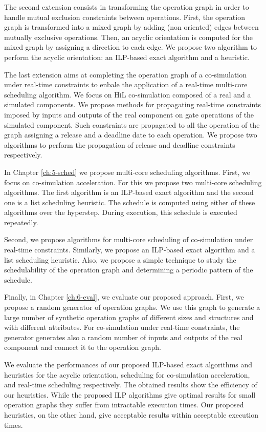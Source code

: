 The second extension consists in transforming the operation graph in order to handle mutual exclusion constraints between operations. First, the operation graph is transformed into a mixed graph by adding (non oriented) edges between mutually exclusive operations. Then, an acyclic orientation is computed for the mixed graph by assigning a direction to each edge. We propose two algorithm to perform the acyclic orientation: an ILP-based exact algorithm and a heuristic.

The last extension aims at completing the operation graph of a co-simulation under real-time constraints to enbale the application of a real-time multi-core scheduling algorithm. We focus on HiL co-simulation composed of a real and a simulated components. We propose methods for propagating real-time constraints imposed by inputs and outputs of the real component on gate operations of the simulated component. Such constraints are propagated to all the operation of the graph assigning a release and a deadline date to each operation. We propose two algorithms to perform the propagation of release and deadline constraints respectively.

In Chapter \ref{ch:5-sched} we propose multi-core scheduling algorithms. First, we focus on co-simulation acceleration. For this we propose two multi-core scheduling algorithms. The first algorithm is an ILP-based exact algorithm and the second one is a list scheduling heuristic. The schedule is computed using either of these algorithms over the hyperstep. During execution, this schedule is executed repeatedly.

Second, we propose algorithms for multi-core scheduling of co-simulation under real-time constraints. Similarly, we propose an ILP-based exact algorithm and a list scheduling heuristic. Also, we propose a simple technique to study the schedulability of the operation graph and determining a periodic pattern of the schedule.

Finally, in Chapter \ref{ch:6-eval}, we evaluate our proposed approach. First, we propose a random generator of operation graphs. We use this graph to generate a large number of synthetic operation graphs of different sizes and structures and with different attributes. For co-simulation under real-time constraints, the generator generates also a random number of inputs and outputs of the real component and connect it to the operation graph. 

We evaluate the performances of our proposed ILP-based exact algorithms and heuristics for the acyclic orientation, scheduling for co-simulation acceleration, and real-time scheduling respectively. The obtained results show the efficiency of our heuristics. While the proposed ILP algorithms give optimal results for small operation graphs they suffer from intractable execution times. Our proposed heuristics, on the other hand, give acceptable results within acceptable execution times.

